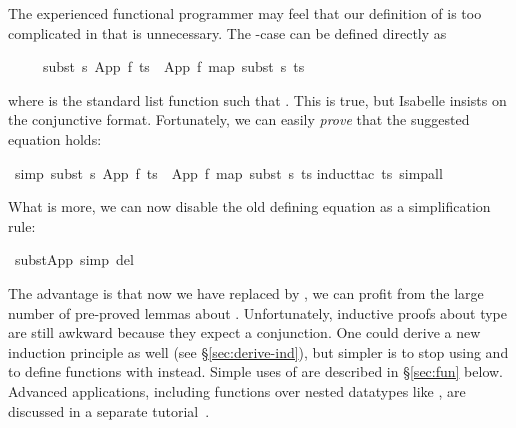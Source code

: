 \begin{isabellebody}
\begin{isamarkuptext}
The experienced functional programmer may feel that our definition of
 is too complicated in that  is
unnecessary. The -case can be defined directly as
\begin{isabelle}%
\ \ \ \ \ subst\ s\ {\isacharparenleft}App\ f\ ts{\isacharparenright}\ {\isacharequal}\ App\ f\ {\isacharparenleft}map\ {\isacharparenleft}subst\ s{\isacharparenright}\ ts{\isacharparenright}%
\end{isabelle}
where  is the standard list function such that
. This is true, but Isabelle
insists on the conjunctive format. Fortunately, we can easily \emph{prove}
that the suggested equation holds:%
\end{isamarkuptext}%
\isamarkuptrue%
%
\isadelimproof
%
\endisadelimproof
%
\isatagproof
%
\endisatagproof
{\isafoldproof}%
%
\isadelimproof
%
\endisadelimproof
%
\isadelimproof
%
\endisadelimproof
%
\isatagproof
%
\endisatagproof
{\isafoldproof}%
%
\isadelimproof
%
\endisadelimproof
%
\isadelimproof
%
\endisadelimproof
%
\isatagproof
%
\endisatagproof
{\isafoldproof}%
%
\isadelimproof
\isanewline
%
\endisadelimproof
{}\isamarkupfalse%
\ {\isacharbrackleft}simp{\isacharbrackright}{\isacharcolon}\ {\isachardoublequoteopen}subst\ s\ {\isacharparenleft}App\ f\ ts{\isacharparenright}\ {\isacharequal}\ App\ f\ {\isacharparenleft}map\ {\isacharparenleft}subst\ s{\isacharparenright}\ ts{\isacharparenright}{\isachardoublequoteclose}\isanewline
%
\isadelimproof
%
\endisadelimproof
%
\isatagproof
{}\isamarkupfalse%
{\isacharparenleft}induct{\isacharunderscore}tac\ ts{\isacharcomma}\ simp{\isacharunderscore}all{\isacharparenright}\isanewline
{}\isamarkupfalse%
%
\endisatagproof
{\isafoldproof}%
%
\isadelimproof
%
\endisadelimproof
%
\begin{isamarkuptext}%
\noindent
What is more, we can now disable the old defining equation as a
simplification rule:%
\end{isamarkuptext}%
\isamarkuptrue%
\isamarkupfalse%
\ subst{\isacharunderscore}App\ {\isacharbrackleft}simp\ del{\isacharbrackright}%
\begin{isamarkuptext}%
\noindent The advantage is that now we have replaced  by , we can profit from the large number of
pre-proved lemmas about .  Unfortunately, inductive proofs
about type  are still awkward because they expect a
conjunction. One could derive a new induction principle as well (see
\S\ref{sec:derive-ind}), but simpler is to stop using
 and to define functions with 
instead.  Simple uses of  are described in
\S\ref{sec:fun} below.  Advanced applications, including functions
over nested datatypes like , are discussed in a
separate tutorial~\cite{isabelle-function}.


\end{isamarkuptext}
\end{isabellebody}
